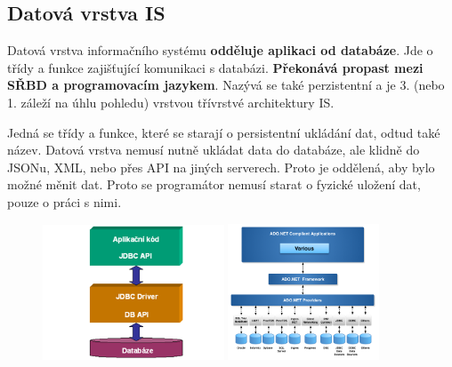 \subsection{Datová vrstva IS}
Datová vrstva informačního systému \textbf{odděluje aplikaci od databáze}. Jde o třídy a funkce zajišťující komunikaci s databázi. \textbf{Překonává propast mezi SŘBD a programovacím jazykem}. Nazývá se také perzistentní a je 3. (nebo 1. záleží na úhlu pohledu) vrstvou třívrstvé architektury IS.

Jedná se třídy a funkce, které se starají o persistentní ukládání dat, odtud také název. Datová vrstva nemusí nutně ukládat data do databáze, ale klidně do JSONu, XML, nebo přes API na jiných serverech. Proto je oddělená, aby bylo možné měnit  dat. Proto se programátor nemusí starat o fyzické uložení dat, pouze o práci s nimi.

\begin{figure}[H]
	\centering
	\includegraphics[width=0.48\textwidth]{assets/jdbc.png}
	\includegraphics[width=0.4\textwidth]{assets/adonet.png}
\end{figure}

